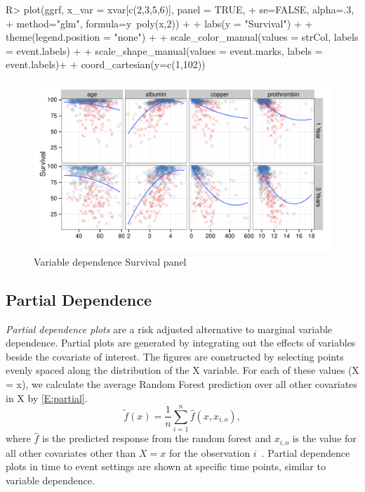 \documentclass[nojss]{jss}\usepackage[]{graphicx}\usepackage[]{color}
\makeatletter
\def\maxwidth{ %
  \ifdim\Gin@nat@width>\linewidth
    \linewidth
  \else
    \Gin@nat@width
  \fi
}
\makeatother
\begin{document}
\begin{Schunk}
\begin{Sinput}
R> plot(ggrf, x_var = xvar[c(2,3,5,6)], panel = TRUE, 
+      se=FALSE, alpha=.3, 
+      method="glm", formula=y~poly(x,2)) + 
+   labs(y = "Survival") + 
+   theme(legend.position = "none") + 
+   scale_color_manual(values = strCol, labels = event.labels) + 
+   scale_shape_manual(values = event.marks, labels = event.labels)+
+   coord_cartesian(y=c(1,102))
\end{Sinput}
\begin{figure}[!htpb]

{\centering \includegraphics[width=\maxwidth]{figure/rfs-variable-plotCombines-1} 

}

\caption[Variable dependence Survival panel]{Variable dependence Survival panel\label{fig:variable-plotCombines}}
\end{figure}
\end{Schunk}

\subsection{Partial Dependence}\label{S:partialDependence}

\emph{Partial dependence plots} are a risk adjusted alternative to marginal variable dependence. Partial plots are generated by integrating out the effects of variables beside the covariate of interest. The figures are constructed by selecting points evenly spaced along the distribution of the X variable. For each of these values (X = x), we calculate the average Random Forest prediction over all other covariates in X by \eqref{E:partial}.
\begin{equation}
\tilde{f}(x) = \frac{1}{n} \sum_{i = 1}^n \hat{f}(x, x_{i, o}), 
\label{E:partial}
\end{equation}
where $\hat{f}$ is the predicted response from the random forest and $x_{i, o}$ is the value for all other covariates other than $X = x$ for the observation $i$~\citep{FriedmanGreedyfunction:2000}. Partial dependence plots in time to event settings are shown at specific time points, similar to variable dependence.
\end{document}
